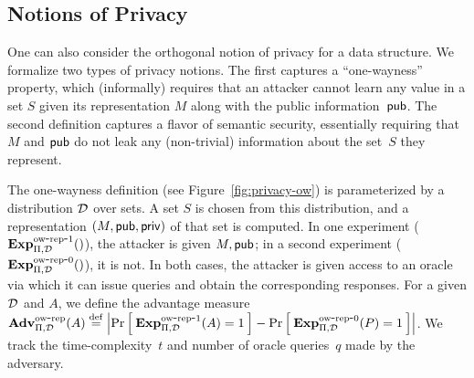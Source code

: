 
\subsection{Notions of Privacy}
One can also consider the orthogonal notion of privacy for a
data structure. 
We formalize two types of privacy notions. The first captures
a ``one-wayness'' property, which (informally) requires that an attacker
cannot learn any value in a set $S$ given its
representation $M$ along with the public information~${\sf pub}$.  The second definition
captures a flavor of semantic security, essentially requiring that $M$ and ${\sf pub}$ do
not leak any (non-trivial) information about the set~$S$ they represent.

The one-wayness definition (see
Figure~\ref{fig:privacy-ow}) is parameterized by a distribution $\mathcal{D}_{}^{}$ over
sets.  
A set $S$ is chosen from this distribution, and a representation
$(M,{\sf pub},{\sf priv})$ of that set is computed.
In one experiment ($\ExpPriv{\Pi,\distr{}{}}$), the attacker is given $M, {\sf pub}$;
in a second experiment ($\mathrm{\mathbf{Exp}}^{\mathrm{ow\mbox{-}rep\mbox{-}0}}_{\Pi,\mathcal{D}_{}^{}}()$), it is not.
In both cases, the attacker is given
access to an oracle via which it can
issue queries and obtain the corresponding responses.
For a given $\mathcal{D}_{}^{}$ and $A$, we define the advantage measure
$\mathrm{\mathbf{Adv}}^{\mathrm{ow\mbox{-}rep}}_{\Pi,\mathcal{D}_{}^{}}(A) \stackrel{\rm def}{=}
\left| \Pr\left[\: \mathrm{\mathbf{Exp}}^{\mathrm{ow\mbox{-}rep\mbox{-}1}}_{\Pi,\mathcal{D}_{}^{}}(A)=1 \:\right] - \Pr\left[\: \mathrm{\mathbf{Exp}}^{\mathrm{ow\mbox{-}rep\mbox{-}0}}_{\Pi,\mathcal{D}_{}^{}}(P)=1 \:\right] \right|$.
We track the
time-complexity~$t$ and number of oracle queries~$q$ made by the adversary.


